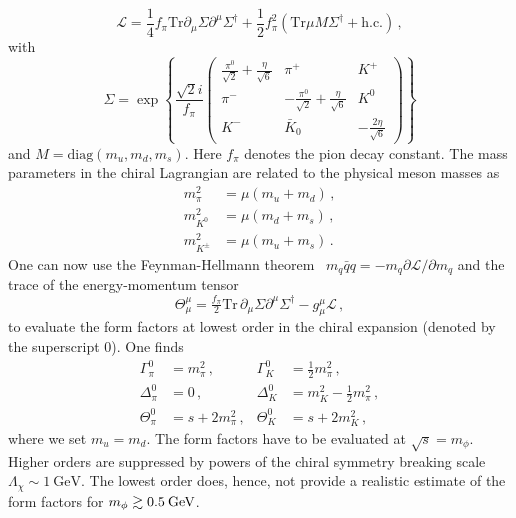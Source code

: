 \documentclass[preprintnumbers,twocolumn,aps,floats,nofootinbib]{revtex4-1}
\newcommand{\eVdist}{\kern-0.06em}
\newcommand{\gev}{\:\text{Ge\eVdist V}}
\begin{document}
\begin{equation}
 \mathcal{L} = \frac{1}{4}f_\pi \text{Tr}\partial_\mu\Sigma\partial^\mu\Sigma^\dagger + \frac{1}{2} f_\pi^2 \left( \text{Tr} \mu M \Sigma^\dagger +\text{h.c.}\right)\,,
\end{equation}
with
\begin{equation}
 \Sigma = \exp\left\{ \frac{\sqrt{2} i}{f_\pi} 
 \left(\begin{smallmatrix}
  \frac{\pi^0}{\sqrt{2}} + \frac{\eta}{\sqrt{6}} & \pi^+ & K^+\\
  \pi^- & -\frac{\pi^0}{\sqrt{2}}+\frac{\eta}{\sqrt{6}} & K^0\\
  K^- & \bar{K}_0 & -\frac{2\eta}{\sqrt{6}}
   \end{smallmatrix}\right)
\right\}
\end{equation}
and $M=\text{diag}(m_u,m_d,m_s)$. Here $f_\pi$ denotes the pion decay constant. The mass parameters in the chiral Lagrangian are related to the physical meson masses as
\begin{align}
 m_\pi^2&= \mu (m_u+m_d)\,,\nonumber\\
 m_{K^0}^2&= \mu(m_d + m_s)\,,\nonumber\\
 m_{K^\pm}^2&= \mu(m_u + m_s)\,.
\end{align} 
One can now use the Feynman-Hellmann theorem~\cite{Hellmann:1937,Feynman:1939zza} $m_q\bar{q}q = -m_q \partial \mathcal{L}/ \partial m_q$ and the trace of the energy-momentum tensor
\begin{equation}
 \Theta_\mu^\mu = \tfrac{f_\pi}{2} \text{Tr}\,\partial_\mu\Sigma\partial^\mu\Sigma^\dagger - g_\mu^\mu \mathcal{L}\,,
\end{equation}
to evaluate the form factors at lowest order in the chiral expansion (denoted by the superscript $0$). One finds
\begin{align}\label{eq:formfactors}
 \Gamma_\pi^0 & = m_\pi^2\,, & \Gamma_K^0 &= \tfrac{1}{2} m_\pi^2\,,\nonumber\\
 \Delta_\pi^0 &=  0\,, & \Delta_K^0 &= m_K^2-\tfrac{1}{2}m_\pi^2\,,\nonumber\\
 \Theta_\pi^0 &=  s + 2m_\pi^2\,, & \Theta_K^0 &=  s + 2m_K^2\,,
\end{align} 
where we set $m_u = m_d$. The form factors have to be evaluated at $\sqrt{s}=m_\phi$. Higher orders are suppressed by powers of the chiral symmetry breaking scale $\Lambda_\chi\sim 1\:\text{GeV}$. The lowest order does, hence, not provide a realistic estimate of the form factors for $m_\phi \gtrsim 0.5\gev$.
\end{document}

